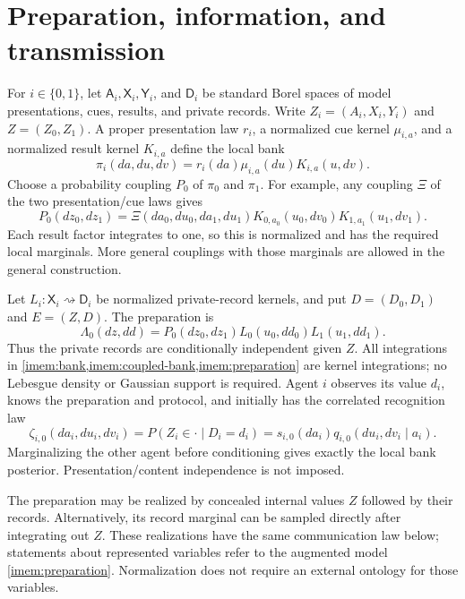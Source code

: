 \section{Preparation, information, and transmission}

For $i\in\{0,1\}$, let $\mathsf A_i,\mathsf X_i,\mathsf Y_i$, and $\mathsf D_i$ be standard Borel spaces of model presentations, cues, results, and private records. Write $Z_i=(A_i,X_i,Y_i)$ and $Z=(Z_0,Z_1)$. A proper presentation law $r_i$, a normalized cue kernel $\mu_{i,a}$, and a normalized result kernel $K_{i,a}$ define the local bank
\begin{equation}
 \pi_i(da,du,dv)=r_i(da)\mu_{i,a}(du)K_{i,a}(u,dv).
 \label{imem:bank}
\end{equation}
Choose a probability coupling $P_0$ of $\pi_0$ and $\pi_1$. For example, any coupling $\Xi$ of the two presentation/cue laws gives
\begin{equation}
 P_0(dz_0,dz_1)=\Xi(da_0,du_0,da_1,du_1)
 K_{0,a_0}(u_0,dv_0)K_{1,a_1}(u_1,dv_1).
 \label{imem:coupled-bank}
\end{equation}
Each result factor integrates to one, so this is normalized and has the required local marginals. More general couplings with those marginals are allowed in the general construction.

Let $L_i:\mathsf X_i\rightsquigarrow\mathsf D_i$ be normalized private-record kernels, and put $D=(D_0,D_1)$ and $E=(Z,D)$. The preparation is
\begin{equation}
 \Lambda_0(dz,dd)=P_0(dz_0,dz_1)L_0(u_0,dd_0)L_1(u_1,dd_1).
 \label{imem:preparation}
\end{equation}
Thus the private records are conditionally independent given $Z$. All integrations in \cref{imem:bank,imem:coupled-bank,imem:preparation} are kernel integrations; no Lebesgue density or Gaussian support is required. Agent $i$ observes its value $d_i$, knows the preparation and protocol, and initially has the correlated recognition law
\begin{equation}
 \zeta_{i,0}(da_i,du_i,dv_i)
 =P(Z_i\in\cdot\mid D_i=d_i)
 =s_{i,0}(da_i)q_{i,0}(du_i,dv_i\mid a_i).
 \label{imem:initial-recognition}
\end{equation}
Marginalizing the other agent before conditioning gives exactly the local bank posterior. Presentation/content independence is not imposed.

The preparation may be realized by concealed internal values $Z$ followed by their records. Alternatively, its record marginal can be sampled directly after integrating out $Z$. These realizations have the same communication law below; statements about represented variables refer to the augmented model \cref{imem:preparation}. Normalization does not require an external ontology for those variables.

